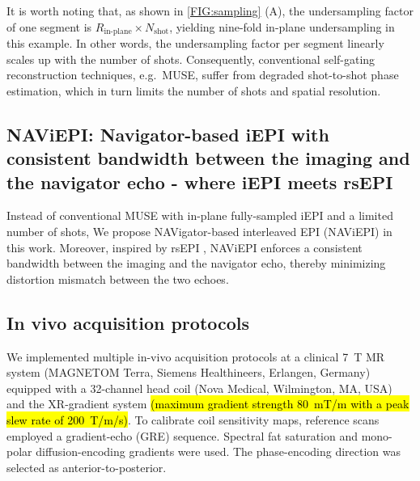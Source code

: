 \documentclass[preprint,12pt,authoryear,review]{elsarticle}
\begin{document}
    It is worth noting that, as shown in \cref{FIG:sampling} (A),
    the undersampling factor of one segment is
    $R_\text{in-plane} \times N_\mathrm{shot}$,
    yielding nine-fold in-plane undersampling in this example.
    In other words, the undersampling factor per segment
    linearly scales up with the number of shots.
    Consequently, conventional self-gating reconstruction techniques,
    e.g.~MUSE, suffer from degraded shot-to-shot phase estimation,
    which in turn limits the number of shots and spatial resolution.

    \subsection{NAViEPI: Navigator-based iEPI with consistent bandwidth
    between the imaging and the navigator echo - where iEPI meets rsEPI}

    Instead of conventional MUSE with in-plane fully-sampled iEPI and
    a limited number of shots,
    We propose NAVigator-based interleaved EPI (NAViEPI)
    in this work.
    Moreover, inspired by rsEPI \citep{porter_2009_resolve},
    NAViEPI enforces a consistent bandwidth
    between the imaging and the navigator echo,
    thereby minimizing distortion mismatch between the two echoes.



    \subsection{In vivo acquisition protocols}

    We implemented multiple in-vivo acquisition protocols
    at a clinical \SI{7}{\tesla} MR system
    (MAGNETOM Terra, Siemens Healthineers, Erlangen, Germany)
    equipped with a 32-channel head coil (Nova Medical, Wilmington, MA, USA)
    and the XR-gradient system
    \hl{(maximum gradient strength \mbox{\SI{80}{\milli\tesla / \meter}}
    with a peak slew rate of \mbox{\SI{200}{\tesla / \meter / \second}})}. 
    To calibrate coil sensitivity maps, reference scans employed a gradient-echo (GRE) sequence.
    Spectral fat saturation and mono-polar diffusion-encoding gradients were used.
    The phase-encoding direction was selected as anterior-to-posterior.
\end{document}
